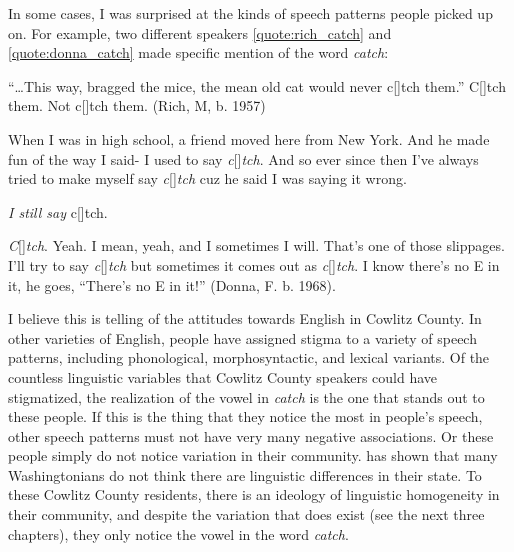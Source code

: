 In some cases, I was surprised at the kinds of speech patterns people picked up on. For example, two different speakers \ref{quote:rich_catch} and \ref{quote:donna_catch} made specific mention of the word \textit{catch}:
\begin{num_quote} %
    [As a part of the reading passage] ``\ldots This way, bragged the mice, the mean old cat would never c[\textipa{\ae}]tch them.'' C[\textipa{\ae}]tch them. Not c[]tch them. (Rich, M, b. 1957)
    \label{quote:rich_catch}
\end{num_quote}
\begin{num_quote} %
    When I was in high school, a friend moved here from New York. And he made fun of the way I said- I used to say \textit{c}[]\textit{tch}. And so ever since then I've always tried to make myself say \textit{c}[\textipa{\ae}]\textit{tch} cuz he said I was saying it wrong. 
    
    \textit{I still say} c[]tch.
    
    \textit{C}[]\textit{tch}. Yeah. I mean, yeah, and I sometimes I will. That's one of those slippages. I'll try to say \textit{c}[\textipa{\ae}]\textit{tch} but sometimes it comes out as \textit{c}[]\textit{tch}. I know there's no E in it, he goes, ``There's no E in it!'' (Donna, F. b. 1968).
    \label{quote:donna_catch}
\end{num_quote}
I believe this is telling of the attitudes towards English in Cowlitz County. In other varieties of English, people have assigned stigma to a variety of speech patterns, including phonological, morphosyntactic, and lexical variants. Of the countless linguistic variables that Cowlitz County speakers could have stigmatized, the realization of the vowel in \textit{catch} is the one that stands out to these people. If this is the thing that they notice the most in people's speech, other speech patterns must not have very many negative associations. Or these people simply do not notice variation in their community. \citet{evans_2013} has shown that many Washingtonians do not think there are linguistic differences in their state. To these Cowlitz County residents, there is an ideology of linguistic homogeneity in their community, and despite the variation that does exist (see the next three chapters), they only notice the vowel in the word \textit{catch}.

